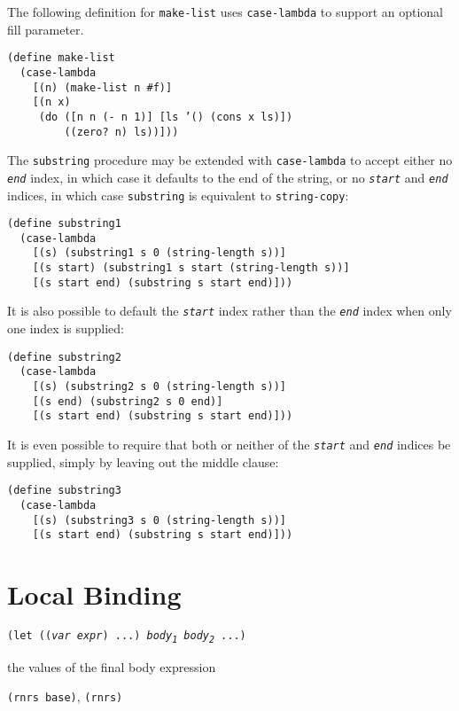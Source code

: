 The following definition for \label{binding_s14}\texttt{make-list} uses \texttt{case-lambda} to
support an optional fill parameter.


\begin{alltt}
(define make-list
  (case-lambda
    [(n) (make-list n \#{}f)]
    [(n x)
     (do ([n n (- n 1)] [ls '() (cons x ls)])
         ((zero? n) ls))]))
\end{alltt}


The \label{binding_s15}\texttt{substring} procedure may be extended with \texttt{case-lambda} to
accept either no \texttt{\textit{end}} index, in which case it defaults to the
end of the string, or no \texttt{\textit{start}} and \texttt{\textit{end}} indices, in which
case \texttt{substring} is equivalent to \texttt{string-copy}:


\begin{alltt}
(define substring1
  (case-lambda
    [(s) (substring1 s 0 (string-length s))]
    [(s start) (substring1 s start (string-length s))]
    [(s start end) (substring s start end)]))
\end{alltt}


It is also possible to default the \texttt{\textit{start}} index rather than
the \texttt{\textit{end}} index when only one index is supplied:


\begin{alltt}
(define substring2
  (case-lambda
    [(s) (substring2 s 0 (string-length s))]
    [(s end) (substring2 s 0 end)]
    [(s start end) (substring s start end)]))
\end{alltt}


It is even possible to require that both or neither of the \texttt{\textit{start}}
and \texttt{\textit{end}} indices be supplied, simply by leaving out the middle
clause:


\begin{alltt}
(define substring3
  (case-lambda
    [(s) (substring3 s 0 (string-length s))]
    [(s start end) (substring s start end)]))
\end{alltt}

\section{\label{binding_g92}\label{binding_h4}Local Binding\label{binding_SECTLOCALBINDING}}


\begin{description}

\label{binding_s16}\item[syntax] \texttt{(let ((\textit{var} \textit{expr}) ...) \textit{body\textsubscript{1}} \textit{body\textsubscript{2}} ...)}



\item[returns] the values of the final body expression


\item[libraries] \texttt{(rnrs base)}, \texttt{(rnrs)}
\end{description}

